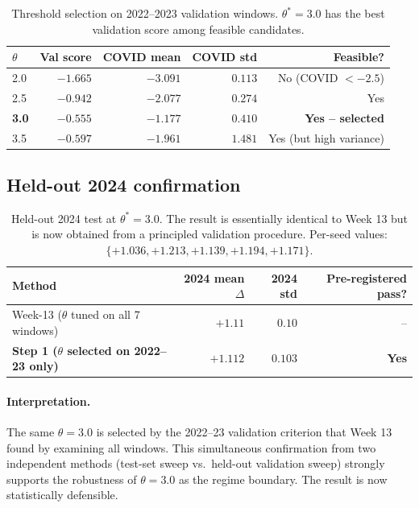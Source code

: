 \documentclass[11pt, a4paper]{article}
\begin{document}
\begin{table}[h!]
\centering
\small
\begin{tabular}{lrrrr}
\toprule
$\theta$ & Val score & COVID mean & COVID std & Feasible? \\
\midrule
2.0 & $-1.665$ & $-3.091$ & $0.113$ & No (COVID $< -2.5$) \\
2.5 & $-0.942$ & $-2.077$ & $0.274$ & Yes \\
\textbf{3.0} & $\mathbf{-0.555}$ & $\mathbf{-1.177}$ & $\mathbf{0.410}$ & \textbf{Yes -- selected} \\
3.5 & $-0.597$ & $-1.961$ & $1.481$ & Yes (but high variance) \\
\bottomrule
\end{tabular}
\caption{Threshold selection on 2022--2023 validation windows.
$\theta^* = 3.0$ has the best validation score among feasible candidates.}
\label{tab:step1-selection}
\end{table}

\subsection{Held-out 2024 confirmation}

\begin{table}[h!]
\centering
\small
\begin{tabular}{lrrr}
\toprule
Method & 2024 mean $\Delta$ & 2024 std & Pre-registered pass? \\
\midrule
Week-13 ($\theta$ tuned on all 7 windows) & $+1.11$ & $0.10$ & -- \\
\textbf{Step 1 ($\theta$ selected on 2022--23 only)} &
  $\mathbf{+1.112}$ & $\mathbf{0.103}$ & \textbf{Yes} \\
\bottomrule
\end{tabular}
\caption{Held-out 2024 test at $\theta^* = 3.0$.
The result is essentially identical to Week 13 but is now obtained
from a principled validation procedure. Per-seed values:
$\{+1.036, +1.213, +1.139, +1.194, +1.171\}$.}
\label{tab:step1-2024}
\end{table}

\paragraph{Interpretation.} The same $\theta = 3.0$ is selected by the
2022--23 validation criterion that Week 13 found by examining all
windows. This simultaneous confirmation from two independent methods
(test-set sweep vs.\ held-out validation sweep) strongly supports the
robustness of $\theta = 3.0$ as the regime boundary. The result is now
statistically defensible.
\end{document}
